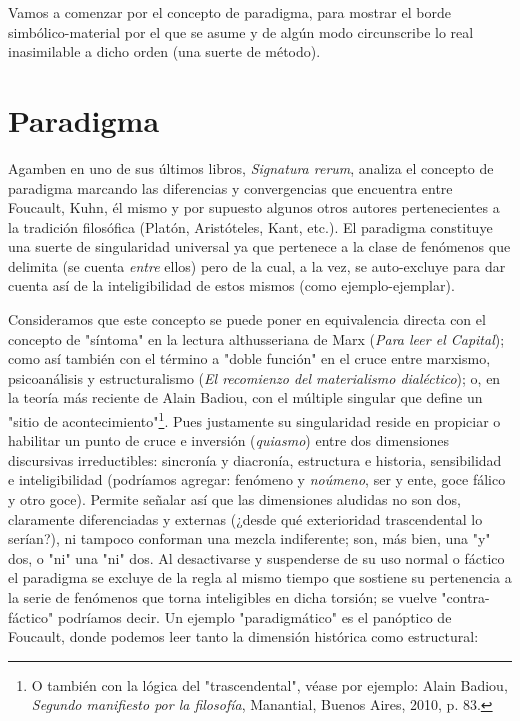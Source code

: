 Vamos a comenzar por el concepto de paradigma, para mostrar el borde
simbólico-material por el que se asume y de algún modo circunscribe lo
real inasimilable a dicho orden (una suerte de método).

\section{Paradigma}

Agamben en uno de sus últimos libros, \emph{Signatura rerum}, analiza el
concepto de paradigma marcando las diferencias y convergencias que
encuentra entre Foucault, Kuhn, él mismo y por supuesto algunos otros
autores pertenecientes a la tradición filosófica (Platón, Aristóteles,
Kant, etc.). El paradigma constituye una suerte de singularidad
universal ya que pertenece a la clase de fenómenos que delimita (se
cuenta \emph{entre} ellos) pero de la cual, a la vez, se auto-excluye
para dar cuenta así de la inteligibilidad de estos mismos (como
ejemplo-ejemplar).

Consideramos que este concepto se puede poner en equivalencia directa
con el concepto de "síntoma" en la lectura althusseriana de Marx
(\emph{Para leer el Capital}); como así también con el término a "doble
función" en el cruce entre marxismo, psicoanálisis y estructuralismo
(\emph{El recomienzo del materialismo dialéctico}); o, en la teoría más
reciente de Alain Badiou, con el múltiple singular que define un "sitio
de acontecimiento"\footnote{O también con la lógica del "trascendental",
  véase por ejemplo: Alain Badiou, \emph{Segundo manifiesto por la
  filosofía}, Manantial, Buenos Aires, 2010, p. 83.}. Pues justamente su
singularidad reside en propiciar o habilitar un punto de cruce e
inversión (\emph{quiasmo}) entre dos dimensiones discursivas
irreductibles: sincronía y diacronía, estructura e historia,
sensibilidad e inteligibilidad (podríamos agregar: fenómeno y
\emph{noúmeno}, ser y ente, goce fálico y otro goce). Permite señalar
así que las dimensiones aludidas no son dos, claramente diferenciadas y
externas (¿desde qué exterioridad trascendental lo serían?), ni tampoco
conforman una mezcla indiferente; son, más bien, una "y" dos, o "ni" una
"ni" dos. Al desactivarse y suspenderse de su uso normal o fáctico el
paradigma se excluye de la regla al mismo tiempo que sostiene su
pertenencia a la serie de fenómenos que torna inteligibles en dicha
torsión; se vuelve "contra-fáctico" podríamos decir. Un ejemplo
"paradigmático" es el panóptico de Foucault, donde podemos leer tanto la
dimensión histórica como estructural:

